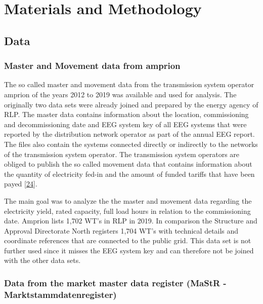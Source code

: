 \documentclass[a4paper,11pt]{article}
\begin{document}
\hypertarget{materials-and-methodology}{%
\section{Materials and Methodology}\label{materials-and-methodology}}

\hypertarget{data}{%
\subsection{Data}\label{data}}

\hypertarget{master-and-movement-data-from-amprion}{%
\subsubsection{Master and Movement data from amprion}\label{master-and-movement-data-from-amprion}}

The so called master and movement data from the transmission system operator amprion of the years 2012 to 2019 was available and used for analysis. The originally two data sets were already joined and prepared by the energy agency of RLP. The master data contains information about the location, commissioning and decommissioning date and EEG system key of all EEG systems that were reported by the distribution network operator as part of the annual EEG report. The files also contain the systems connected directly or indirectly to the networks of the transmission system operator. The transmission system operators are obliged to publish the so called movement data that contains information about the quantity of electricity fed-in and the amount of funded tariffs that have been payed {[}\protect\hyperlink{ref-AmprionGmbH.2019}{24}{]}.

The main goal was to analyze the the master and movement data regarding the electricity yield, rated capacity, full load hours in relation to the commissioning date. Amprion lists 1,702 WT's in RLP in 2019. In comparison the Structure and Approval Directorate North registers 1,704 WT's with technical details and coordinate references that are connected to the public grid. This data set is not further used since it misses the EEG system key and can therefore not be joined with the other data sets.

\hypertarget{data-from-the-market-master-data-register-mastr---marktstammdatenregister}{%
\subsubsection{Data from the market master data register (MaStR - Marktstammdatenregister)}\label{data-from-the-market-master-data-register-mastr---marktstammdatenregister}}
\end{document}
